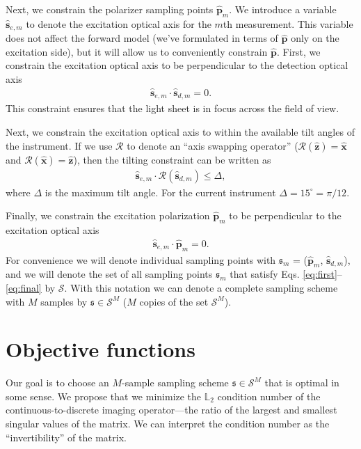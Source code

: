 \documentclass[11pt]{article}
\providecommand{\mc}[1]{\mathcal{#1}}
\providecommand{\pp}{\mathbf{\hat{p}}}
\providecommand{\mh}[1]{\mathbf{\hat{#1}}}
\providecommand{\mf}[1]{\mathfrak{#1}}
\providecommand{\mbb}[1]{\mathbb{#1}}
\begin{document}
Next, we constrain the polarizer sampling points $\mh{p}_m$. We introduce a
variable $\mh{s}_{e,m}$ to denote the excitation optical axis for the $m$th
measurement. This variable does not affect the forward model (we've formulated
in terms of $\pp$ only on the excitation side), but it will allow us to
conveniently constrain $\pp$. First, we constrain the excitation optical axis to
be perpendicular to the detection optical axis
\begin{align}
  \mh{s}_{e,m} \cdot \mh{s}_{d,m} = 0.
\end{align}
This constraint ensures that the light sheet is in focus across the field of
view.

Next, we constrain the excitation optical axis to within the available tilt
angles of the instrument. If we use $\mc{R}$ to denote an ``axis swapping
operator'' ($\mc{R}(\mh{z}) = \mh{x}$ and $\mc{R}(\mh{x}) = \mh{z}$), then the tilting
constraint can be written as
\begin{align}
  \mh{s}_{e,m} \cdot \mc{R}(\mh{s}_{d,m}) \leq \Delta,
\end{align}
where $\Delta$ is the maximum tilt angle. For the current instrument $\Delta = 15^{\circ} = \pi/12$.

Finally, we constrain the excitation polarization $\pp_m$ to be perpendicular to
the excitation optical axis
\begin{align}
  \mh{s}_{e,m} \cdot \pp_m = 0.  \label{eq:final}
\end{align}
For convenience we will denote individual sampling points with $\mf{s}_m$ =
($\pp_m$, $\mh{s}_{d,m}$), and we will denote the set of all sampling points
$\mf{s}_m$ that satisfy Eqs. \eqref{eq:first}--\eqref{eq:final} by $\mc{S}$.
With this notation we can denote a complete sampling scheme with $M$ samples
by $\mf{s} \in \mc{S}^M$ ($M$ copies of the set $\mc{S}^M$).

\section{Objective functions}
Our goal is to choose an $M$-sample sampling scheme $\mf{s} \in \mc{S}^M$ that
is optimal in some sense. We propose that we minimize the $\mbb{L}_2$ condition
number of the continuous-to-discrete imaging operator---the ratio of the largest
and smallest singular values of the matrix. We can interpret the condition
number as the ``invertibility'' of the matrix.
\end{document}
